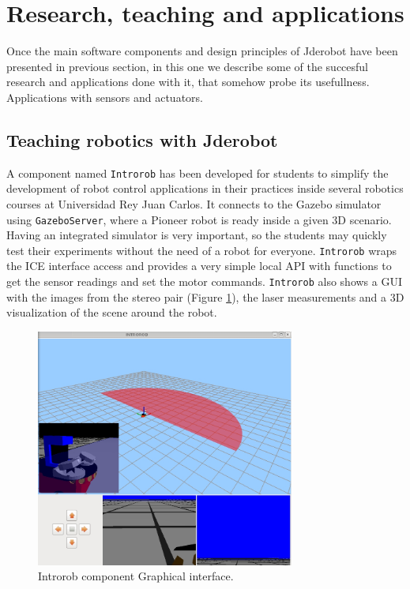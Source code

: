 \documentclass[twocolumn]{svjour3}          %
\begin{document}
\section{Research, teaching and applications}
\label{sec:applications}

Once the main software components and design principles of Jderobot have been presented in previous section, in this one we describe some of the succesful research and applications done with it, that somehow probe its usefullness. Applications with sensors and actuators.

\subsection{Teaching robotics with Jderobot}

A component named \texttt{Introrob} has been developed for students to simplify the development of robot control applications in their practices inside several robotics courses at Universidad Rey Juan Carlos. It connects to the Gazebo simulator using \texttt{GazeboServer}, where a Pioneer robot is ready inside a given 3D scenario. Having an integrated simulator is very important, so the students may quickly test their experiments without the need of a robot for everyone. \texttt{Introrob} wraps the ICE interface access and provides a very simple local API with functions to get the sensor readings and set the motor commands. \texttt{Introrob} also shows a GUI with the images from the stereo pair (Figure \ref{fig:introrob}), the laser measurements and a 3D visualization of the scene around the robot. 

\begin{figure}[h!]
  \includegraphics[width=8.5cm]{figs/introrob.jpg}
\caption{Introrob component Graphical interface.}
\label{fig:introrob}
\end{figure}
\end{document}
